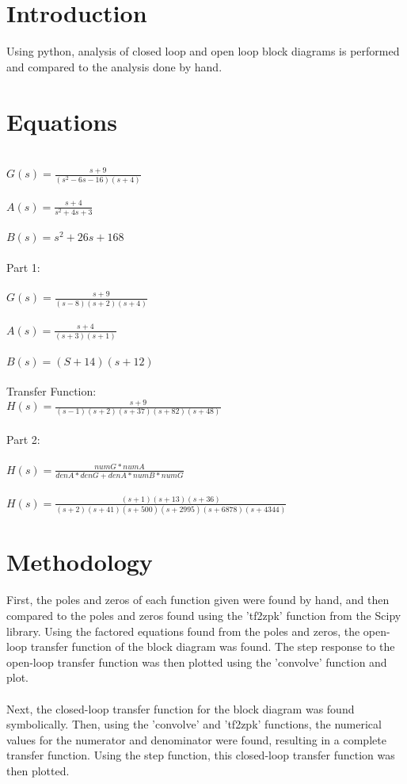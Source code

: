 \documentclass[12pt]{report}
\begin{document}
\section{Introduction}
Using python, analysis of closed loop and open loop block diagrams is performed and compared to the analysis done by hand.

\section{Equations}
\\$G(s) = \frac{s+9}{(s^2-6s-16)(s+4)}$
\\
\\$A(s) = \frac{s+4}{s^2+4s+3}$
\\
\\$B(s)= s^2+26s+168$
\\
\\ Part 1:
\\
\\ $G(s) = \frac{s+9}{(s-8)(s+2)(s+4)}$
\\
\\ $A(s) = \frac{s+4}{(s+3)(s+1)}$
\\
\\ $B(s) = (S+14)(s+12)$
\\
\\Transfer Function:
\\ $H(s) = \frac{s+9}{(s-1)(s+2)(s+37)(s+82)(s+48)}$
\\
\\Part 2:
\\
\\$H(s) = \frac{numG*numA}{denA*denG + denA*numB*numG}$
\\
\\ $H(s) = \frac{(s+1)(s+13)(s+36)}{(s+2)(s+41)(s+500)(s+2995)(s+6878)(s+4344)}$


\section{Methodology}
First, the poles and zeros of each function given were found by hand, and then compared to the poles and zeros found using the 'tf2zpk' function from the Scipy library. Using the factored equations found from the poles and zeros, the open-loop transfer function of the block diagram was found. The step response to the open-loop transfer function was then plotted using the 'convolve' function and plot. 
\\ \\Next, the closed-loop transfer function for the block diagram was found symbolically. Then, using the 'convolve' and 'tf2zpk' functions, the numerical values for the numerator and denominator were found, resulting in a complete transfer function. Using the step function, this closed-loop transfer function was then plotted.
\end{document}
